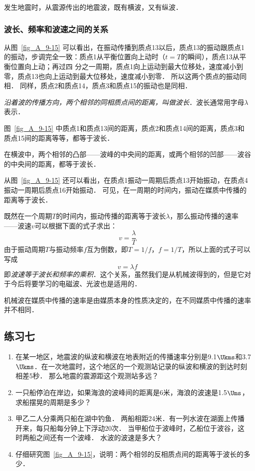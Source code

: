 发生地震时，从震源传出的地震波，既有横波，又有纵波．

\subsubsection{波长、频率和波速之间的关系}

从图~\ref{fig_A_9-15} 可以看出，在振动传播到质点13以后，质点13的振动跟质点1的振动，步调完全一致：质点1从平衡位置向上动时（$t=T$的瞬间），质点13从平衡位置向上动；再过四
分之一周期，质点1向上运动到最大位移处，速度减小到零，质点13也向上运动到最大位移处，速度减小到零．
所以这两个质点的振动同相．
同样，质点2和质点14，质点3和质点15的振动也是同相．

\textit{沿着波的传播方向，两个相邻的同相质点间的距离，叫做波长}．波长通常用字母$\lambda$表示．

图~\ref{fig_A_9-15} 中质点1和质点13间的距离，质点2和质点14间的距离，质点3和质点15间的距离等等，都等于波长．

在横波中，两个相邻的凸部——波峰的中央间的距离，或两个相邻的凹部——波谷的中央间的距离，都等于波长．

从图~\ref{fig_A_9-15} 还可以看出，在质点1振动一周期后质点13开始振动，在质点4振动一周期后质点16开始振动．
可见，在一周期的时间内，振动在媒质中传播的距离等于波长．

既然在一个周期$T$的时间内，振动传播的距离等于波长$\lambda$，那么振动传播的速率——波速$v$可以根据下面的式子求出：
\[v=\frac{\lambda}{T}\]
由于振动周期$T$与振动频率$f$互为倒数，即$T=1/f$，$f=1/T$，所以上面的式子可以写成
\[v=\lambda f\]
即\textit{波速等于波长和频率的乘积}．这个关系，虽然我们是从机械波得到的，但是它对于今后将要学习的电磁波、光波也是适用的．

机械波在媒质中传播的速率是由媒质本身的性质决定的，在不同媒质中传播的速率并不相同．

\subsection*{练习七}
\begin{enumerate}
    \item 在某一地区，地震波的纵波和横波在地表附近的传播速率分别是9.1$\Ukms$和3.7$\Ukms$．在一次地震时，这个地区的一个观测站记录的纵波和横波的到达时刻相差5秒．
    那么地震的震源距这个观测站多远？
    \item 一只船停泊在岸边，如果海浪的波峰间的距离是6米，海浪的波速是1.5$\Ums$，求船摆晃的周期是多少？
    \item 甲乙二人分乘两只船在湖中钓鱼．
    两船相距24米．有一列水波在湖面上传播开来，每只船每分钟上下浮动20次．
    当甲船位于波峰时，乙船位于波谷，这时两船之间还有一个波峰．
    水波的波速是多大？
    \item 仔细研究图~\ref{fig_A_9-15}，说明：两个相邻的反相质点间的距离等于波长的多少．
\end{enumerate}

